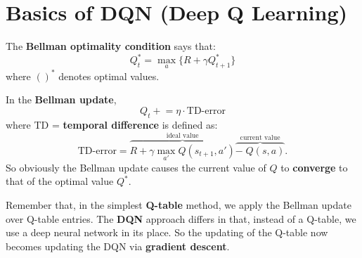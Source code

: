 \section{Basics of DQN (Deep Q Learning)}

The \textbf{Bellman optimality condition} says that:
\begin{equation}
	Q^*_t = \max_{a} \{ R + \gamma Q^*_{t+1} \}
\end{equation}
where $()^*$ denotes optimal values.

In the \textbf{Bellman update},
\begin{equation}
	Q_t \mathrel{+}= \eta \cdot \mbox{TD-error}
\end{equation}
where TD = \textbf{temporal difference} is defined as:
\begin{equation}
	\mbox{TD-error} = \overbrace{R + \gamma \max_{a'} Q(s_{t+1},a')}^{\mbox{ideal value}} \overbrace{ - \; Q(s,a)}^{\mbox{current value}} .
\end{equation}
So obviously the Bellman update causes the current value of $Q$ to \textbf{converge} to that of the optimal value $Q^*$.

Remember that, in the simplest \textbf{Q-table} method, we apply the Bellman update over Q-table entries.  The \textbf{DQN} approach differs in that, instead of a Q-table, we use a deep neural network in its place.  So the updating of the Q-table now becomes updating the DQN via \textbf{gradient descent}.
